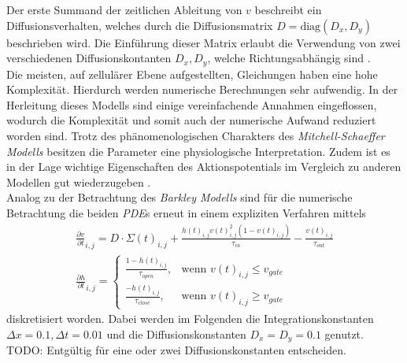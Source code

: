 Der erste Summand der zeitlichen Ableitung von $v$ beschreibt ein Diffusionsverhalten, welches durch die Diffusionsmatrix $D = \text{diag}(D_x, D_y)$ beschrieben wird. Die Einführung dieser Matrix erlaubt die Verwendung von zwei verschiedenen Diffusionskontanten $D_x, D_y$, welche Richtungsabhängig sind \citep{talbot2013towards}.\\

Die meisten, auf zellulärer Ebene aufgestellten, Gleichungen haben eine hohe Komplexität. Hierdurch werden numerische Berechnungen sehr aufwendig. In der Herleitung dieses Modells sind einige vereinfachende Annahmen eingeflossen, wodurch die Komplexität und somit auch der numerische Aufwand reduziert worden sind. Trotz des phänomenologischen Charakters des \textit{Mitchell-Schaeffer Modells} besitzen die Parameter eine physiologische Interpretation. Zudem ist es in der Lage wichtige Eigenschaften des Aktionspotentials im Vergleich zu anderen Modellen gut wiederzugeben \citep{talbot2013towards}.\\

Analog zu der Betrachtung des \textit{Barkley Modells} sind für die numerische Betrachtung die beiden \textit{PDE}s erneut in einem expliziten Verfahren mittels
\begin{equation}
\begin{gathered}
\frac{\partial v}{\partial t}_{i,j} = D \cdot \Sigma(t)_{i,j} + \frac{h(t)_{i,j} v(t)_{i,j}^2(1-v(t)_{i,j})}{\tau_{in}} - \frac{v(t)_{i,j}}{\tau_{out}}\\
\frac{\partial h}{\partial t}_{i,j} = \begin{cases}
	\frac{1-h(t)_{i,j}}{\tau_{open}},& \text{wenn } v(t)_{i,j} \leq v_{gate}\\
    \frac{-h(t)_{i,j}}{\tau_{close}},& \text{wenn } v(t)_{i,j} \geq v_{gate}
\end{cases}
\end{gathered}
\end{equation}
diskretisiert worden. Dabei werden im Folgenden die Integrationskonstanten $\Delta x = 0.1, \Delta t = 0.01$ und die Diffusionskonstanten $D_x = D_y = 0.1$ genutzt.\\

TODO: Entgültig für eine oder zwei Diffusionskonstanten entscheiden.